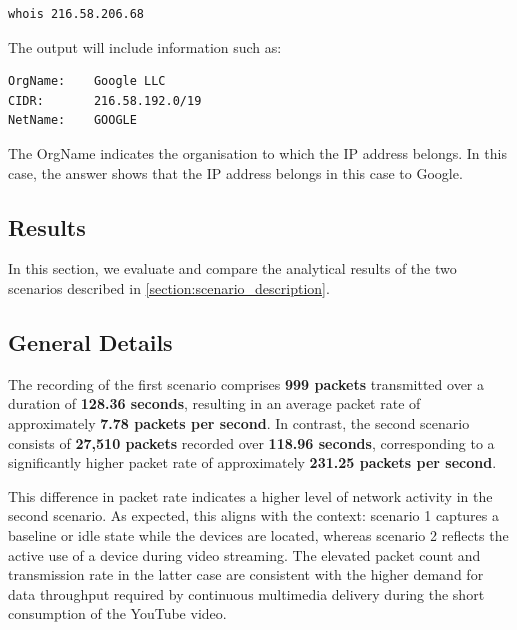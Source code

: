 \documentclass[sigconf,nonacm]{acmart}
\begin{document}
\begin{verbatim}
whois 216.58.206.68
\end{verbatim}

The output will include information such as:

\begin{verbatim}
OrgName:    Google LLC
CIDR:       216.58.192.0/19
NetName:    GOOGLE
\end{verbatim}

The OrgName indicates the organisation to which the IP address belongs. In this case, the answer shows that the IP address belongs in this case to Google.




\subsection{Results}
\label{sec:part-2/ana}
In this section, we evaluate and compare the analytical results of the two scenarios described in \cref{section:scenario_description}.

\subsection{General Details}
\label{sec:part2:general_details}

The recording of the first scenario comprises \textbf{999 packets} transmitted over a duration of \textbf{128.36 seconds}, resulting in an average packet rate of approximately \textbf{7.78 packets per second}. In contrast, the second scenario consists of \textbf{27,510 packets} recorded over \textbf{118.96 seconds}, corresponding to a significantly higher packet rate of approximately \textbf{231.25 packets per second}.

This difference in packet rate indicates a higher level of network activity in the second scenario. As expected, this aligns with the context: scenario 1 captures a baseline or idle state while the devices are located, whereas scenario 2 reflects the active use of a device during video streaming. The elevated packet count and transmission rate in the latter case are consistent with the higher demand for data throughput required by continuous multimedia delivery during the short consumption of the YouTube video.
\end{document}
